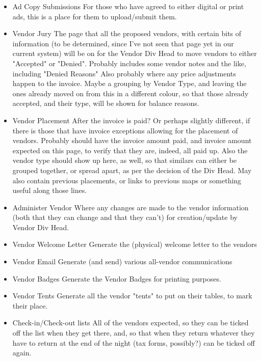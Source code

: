 \documentclass[captions=tablesignature]{scrartcl}
\begin{document}
\begin{itemize}
\item Ad Copy Submissions
\label{sec-3-1-9}
For those who have agreed to either digital or print ads, this is
a place for them to upload/submit them.

\item Vendor Jury
\label{sec-3-1-10}
The page that all the proposed vendors, with certain bits of
information (to be determined, since I've not seen that page yet
in our current system) will be on for the Vendor Div Head to move
vendors to either "Accepted" or "Denied".  Probably includes some
vendor notes and the like, including "Denied Reasons" Also
probably where any price adjustments happen to the invoice.  Maybe
a grouping by Vendor Type, and leaving the ones already moved on
from this in a different colour, so that those already accepted,
and their type, will be shown for balance reasons.

\item Vendor Placement
\label{sec-3-1-11}
After the invoice is paid? Or perhaps slightly different, if there
is those that have invoice exceptions allowing for the placement
of vendors.  Probably should have the invoice amount paid, and
invoice amount expected on this page, to verify that they are,
indeed, all paid up.  Also the vendor type should show up here, as
well, so that similars can either be grouped together, or spread
apart, as per the decision of the Div Head. May also contain
previous placements, or links to previous maps or something useful
along those lines.

\item Administer Vendor
\label{sec-3-1-12}
Where any changes are made to the vendor information (both that
they can change and that they can't) for creation/update by Vendor
Div Head.

\item Vendor Welcome Letter
\label{sec-3-1-13}
Generate the (physical) welcome letter to the vendors

\item Vendor Email
\label{sec-3-1-14}
Generate (and send) various all-vendor communications

\item Vendor Badges
\label{sec-3-1-15}
Generate the Vendor Badges for printing purposes.

\item Vendor Tents
\label{sec-3-1-16}
Generate all the vendor "tents" to put on their tables, to mark
their place.

\item Check-in/Check-out lists
\label{sec-3-1-17}
All of the vendors expected, so they can be ticked off the list
when they get there, and, so that when they return whatever they
have to return at the end of the night (tax forms, possibly?) can
be ticked off again.
\end{itemize}
\end{document}
